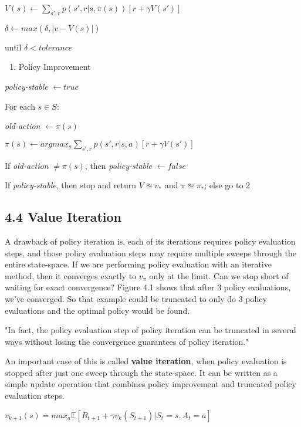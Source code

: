 \documentclass[11pt]{article}
\providecommand{\tightlist}{%
      \setlength{\itemsep}{0pt}\setlength{\parskip}{0pt}}
\begin{document}
\(V(s) \leftarrow \sum_{s', r} p(s', r | s, \pi(s))[r + \gamma V(s')]\)

\(\delta \leftarrow max(\delta, |v - V(s)|)\)

until \(\delta < tolerance\)

\begin{enumerate}
\def\labelenumi{\arabic{enumi}.}
\setcounter{enumi}{2}
\tightlist
\item
  Policy Improvement
\end{enumerate}

\emph{policy-stable} \(\leftarrow true\)

For each \(s \in S\):

\emph{old-action} \(\leftarrow \pi(s)\)

\(\pi(s) \leftarrow argmax_a \sum_{s', r} p(s', r | s, a)[r + \gamma V(s')]\)

If \emph{old-action} \(\neq \pi(s)\), then \emph{policy-stable}
\(\leftarrow false\)

If \emph{policy-stable}, then stop and return \(V \approxeq v_*\) and
\(\pi \approxeq \pi_*\); else go to 2

    \subsection{4.4 Value Iteration}\label{value-iteration}

    A drawback of policy iteration is, each of its iterations requires
policy evaluation steps, and those policy evaluation steps may require
multiple sweeps through the entire state-space. If we are performing
policy evaluation with an iterative method, then it converges exactly to
\(v_\pi\) only at the limit. Can we stop short of waiting for exact
convergence? Figure 4.1 shows that after 3 policy evaluations, we've
converged. So that example could be truncated to only do 3 policy
evaluations and the optimal policy would be found.

    "In fact, the policy evaluation step of policy iteration can be
truncated in several ways without losing the convergence guarantees of
policy iteration."

An important case of this is called \textbf{value iteration}, when
policy evaluation is stopped after just one sweep through the
state-space. It can be written as a simple update operation that
combines policy improvement and truncated policy evaluation steps.

\(v_{k+1}(s) \stackrel{.}{=} max_a \mathbb{E}[R_{t+1} + \gamma v_k(S_{t+1}) | S_t = s, A_t = a]\)
\end{document}

